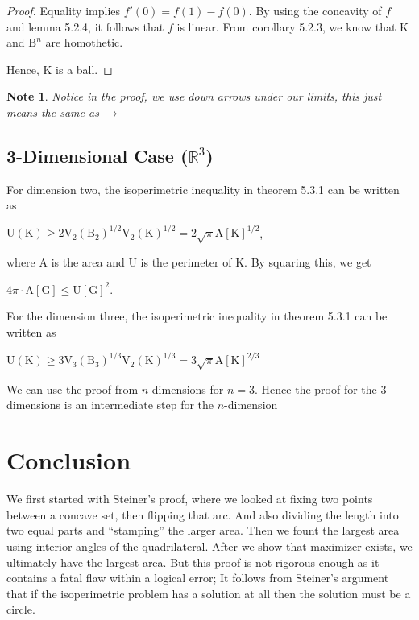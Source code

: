 \documentclass[a4paper]{book}
\newtheorem{note}[theorem]{Note}%
\numberwithin{theorem}{section}%
\begin{document}
\begin{proof}
    Equality implies $f'(0)=f(1)-f(0)$. By using the concavity of $f$ and lemma 5.2.4, it follows that $f$ is linear. From corollary 5.2.3, we know that $\mathrm{K}$ and $\mathrm{B}^{n}$ are homothetic.

    Hence, $\mathrm{K}$ is a ball.
\end{proof}

\begin{note}
    Notice in the proof, we use down arrows under our limits, this just means the same as $\to$
\end{note}

\subsection{3-Dimensional Case ($\mathbb{R}^{3}$)}
For dimension two, the isoperimetric inequality in theorem 5.3.1 can be written as
\begin{center}
$\displaystyle \mathrm{U}(\mathrm{K})\geq 2\mathrm{V}_{2}(\mathrm{B}_{2})^{1/2}\mathrm{V}_{2}(\mathrm{K})^{1/2}=2\sqrt{\pi}\mathrm{A}[\mathrm{K}]^{1/2}$,
\end{center}
where $\mathrm{A}$ is the area and $\mathrm{U}$ is the perimeter of $\mathrm{K}$. By squaring this, we get
\begin{center}
$4\pi\cdot\mathrm{A}[\mathrm{G}]\leq\mathrm{U}[\mathrm{G}]^{2}$.
\end{center}

For the dimension three, the isoperimetric inequality in theorem 5.3.1 can be written as
\begin{center}
$\displaystyle \mathrm{U}(\mathrm{K})\geq 3\mathrm{V}_{3}(\mathrm{B}_{3})^{1/3}\mathrm{V}_{2}(\mathrm{K})^{1/3}=3\sqrt{\pi}\mathrm{A}[\mathrm{K}]^{2/3}$
\end{center}
We can use the proof from $n$-dimensions for $n=3$. Hence the proof for the $3$-dimensions is an intermediate step for the $n$-dimension

\section*{Conclusion}
We first started with Steiner's proof, where we looked at fixing two points between a concave set, then flipping that arc. And also dividing the length into two equal parts and ``stamping'' the larger area. Then we fount the largest area using interior angles of the quadrilateral. After we show that maximizer exists, we ultimately have the largest area. But this proof is not rigorous enough as it contains a fatal flaw within a logical error; It follows from Steiner’s argument that if the isoperimetric problem has a solution at all then the solution must be a circle.
\end{document}
